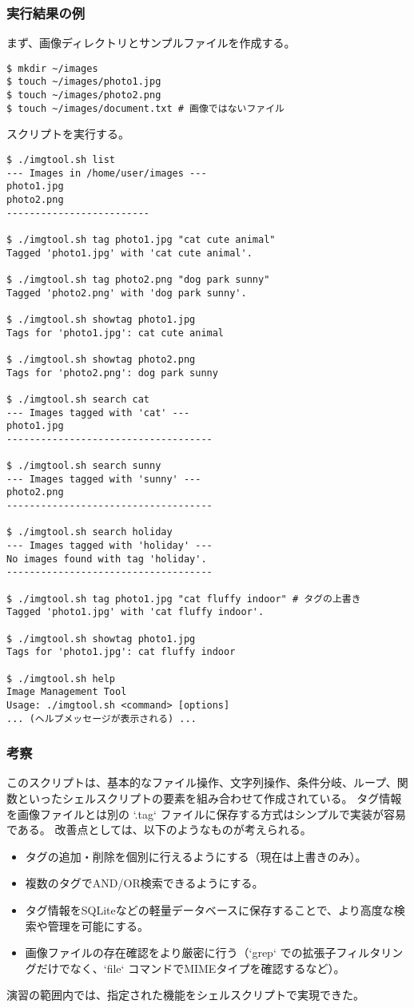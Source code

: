 \documentclass[a4paper,11pt]{jsarticle}
\begin{document}
\subsubsection*{実行結果の例}
まず、画像ディレクトリとサンプルファイルを作成する。
\begin{verbatim}
$ mkdir ~/images
$ touch ~/images/photo1.jpg
$ touch ~/images/photo2.png
$ touch ~/images/document.txt # 画像ではないファイル
\end{verbatim}

スクリプトを実行する。
\begin{verbatim}
$ ./imgtool.sh list
--- Images in /home/user/images ---
photo1.jpg
photo2.png
-------------------------

$ ./imgtool.sh tag photo1.jpg "cat cute animal"
Tagged 'photo1.jpg' with 'cat cute animal'.

$ ./imgtool.sh tag photo2.png "dog park sunny"
Tagged 'photo2.png' with 'dog park sunny'.

$ ./imgtool.sh showtag photo1.jpg
Tags for 'photo1.jpg': cat cute animal

$ ./imgtool.sh showtag photo2.png
Tags for 'photo2.png': dog park sunny

$ ./imgtool.sh search cat
--- Images tagged with 'cat' ---
photo1.jpg
------------------------------------

$ ./imgtool.sh search sunny
--- Images tagged with 'sunny' ---
photo2.png
------------------------------------

$ ./imgtool.sh search holiday
--- Images tagged with 'holiday' ---
No images found with tag 'holiday'.
------------------------------------

$ ./imgtool.sh tag photo1.jpg "cat fluffy indoor" # タグの上書き
Tagged 'photo1.jpg' with 'cat fluffy indoor'.

$ ./imgtool.sh showtag photo1.jpg
Tags for 'photo1.jpg': cat fluffy indoor

$ ./imgtool.sh help
Image Management Tool
Usage: ./imgtool.sh <command> [options]
... (ヘルプメッセージが表示される) ...
\end{verbatim}

\subsubsection*{考察}
このスクリプトは、基本的なファイル操作、文字列操作、条件分岐、ループ、関数といったシェルスクリプトの要素を組み合わせて作成されている。
タグ情報を画像ファイルとは別の `.tag` ファイルに保存する方式はシンプルで実装が容易である。
改善点としては、以下のようなものが考えられる。
\begin{itemize}
    \item タグの追加・削除を個別に行えるようにする（現在は上書きのみ）。
    \item 複数のタグでAND/OR検索できるようにする。
    \item タグ情報をSQLiteなどの軽量データベースに保存することで、より高度な検索や管理を可能にする。
    \item 画像ファイルの存在確認をより厳密に行う（`grep` での拡張子フィルタリングだけでなく、`file` コマンドでMIMEタイプを確認するなど）。
\end{itemize}
演習の範囲内では、指定された機能をシェルスクリプトで実現できた。
\end{document}
